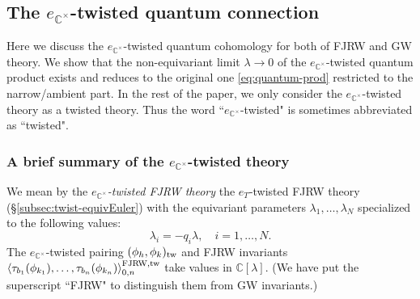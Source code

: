 \documentclass[11pt]{amsart}
\theoremstyle{definition} %
\theoremstyle{remark} %
\newcommand{\CC}{\mathbb C}
\newcommand{\tw}{{\rm tw}}
\def\corr#1{\left\langle #1 \right\rangle}
\def\fracp#1{\left\langle #1 \right\rangle}
\newcommand{\look}[1]{\marginpar{\bf \tiny #1}}
\newcommand{\ext}{{\operatorname{ext}}}
\newcommand{\FJRW}{{\operatorname{FJRW}}}
\begin{document}
\subsection{The $e_{\CC^\times}$-twisted quantum connection}
\label{subsec:twisted-q-connection} 

Here we discuss the $e_{\CC^\times}$-twisted quantum cohomology 
for both of FJRW and GW theory. 
We show that the non-equivariant limit $\lambda \to 0$ of the 
$e_{\CC^\times}$-twisted quantum product exists 
and reduces to the original one \eqref{eq:quantum-prod} 
restricted to the narrow/ambient part. 
In the rest of the paper, we only consider the 
$e_{\CC^\times}$-twisted theory as a twisted theory. 
Thus the word ``$e_{\CC^\times}$-twisted" is sometimes 
abbreviated as ``twisted". 

\subsubsection{A brief summary of the  
$e_{\CC^\times}$-twisted theory} 
\label{subsubsec:summary} 

We mean by the \emph{$e_{\CC^\times}$-twisted FJRW theory} 
the $e_T$-twisted FJRW theory (\S \ref{subsec:twist-equivEuler}) 
with the equivariant parameters $\lambda_1,\dots,\lambda_N$ 
specialized to the following values: 
\[
\lambda_i =  -q_i \lambda, 
\quad i=1,\dots, N.  
\]
The $e_{\CC^\times}$-twisted pairing $(\phi_h,\phi_k)_\tw$ and 
FJRW invariants 
$\corr{\tau_{b_1}(\phi_{k_1}),\dots,
\tau_{b_n}(\phi_{k_n})}_{0,n}^{\FJRW,\tw}$ 
take values in $\CC[\lambda]$. 
(We have put the superscript ``FJRW" 
to distinguish them from GW invariants.)

\end{document}
